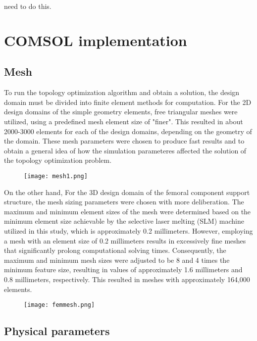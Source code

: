 \documentclass[../main.tex]{subfiles}
\begin{document}
need to do this.

\section{COMSOL implementation}

\subsection{Mesh}

To run the topology optimization algorithm and obtain a solution, the design domain must be divided into finite element methods for computation. For the 2D design domains of the simple geometry elements, free triangular meshes were utilized, using a predefined mesh element size of "finer". This resulted in about 2000-3000 elements for each of the design domains, depending on the geometry of the domain. These mesh parameters were chosen to produce fast results and to obtain a general idea of how the simulation parameteres affected the solution of the topology optimization problem.

\begin{figure}
  \texttt{[image: mesh1.png]}
\end{figure}

On the other hand, For the 3D design domain of the femoral component support structure, the mesh sizing parameters were chosen with more deliberation. The maximum and minimum element sizes of the mesh were determined based on the minimum element size achievable by the selective laser melting (SLM) machine utilized in this study, which is approximately 0.2 millimeters. However, employing a mesh with an element size of 0.2 millimeters results in excessively fine meshes that significantly prolong computational solving times. Consequently, the maximum and minimum mesh sizes were adjusted to be 8 and 4 times the minimum feature size, resulting in values of approximately 1.6 millimeters and 0.8 millimeters, respectively. This resulted in meshes with approximately 164,000 elements.

\begin{figure}
  \texttt{[image: femmesh.png]}
\end{figure}



\subsection{Physical parameters}
\end{document}
